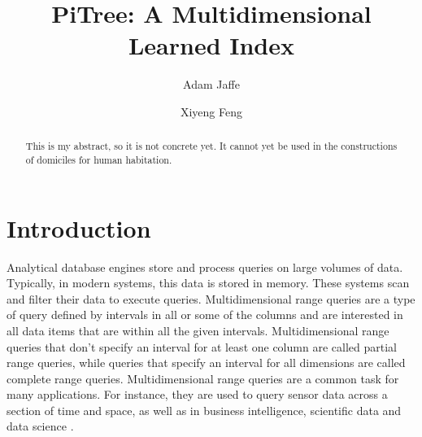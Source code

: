 \documentclass[sigconf,10pt]{acmart}
\begin{document}
\title{PiTree: A Multidimensional Learned Index}


\author{Adam Jaffe}

\author{Xiyeng Feng}



\begin{abstract}
  This is my abstract, so it is not concrete yet. It cannot yet be used
  in the constructions of domiciles for human habitation.
\end{abstract}


\maketitle

\section{Introduction}

Analytical database engines store and process queries on large volumes of data.
Typically, in modern systems, this data is stored in memory. %
These systems scan and filter their data to execute queries.
Multidimensional range queries are a type of query defined by 
intervals in all or some of the columns and are interested in all data items
that are within all the given intervals. Multidimensional range queries that don't specify
an interval for at least one column are called partial range queries, while queries that specify
an interval for all dimensions are called complete range queries.
Multidimensional range queries are a common task for many applications.
For instance, they are used to query sensor data across a section of time and space, as well as in business
intelligence, scientific data and data science \cite{ModernMDRQ}.
\end{document}
